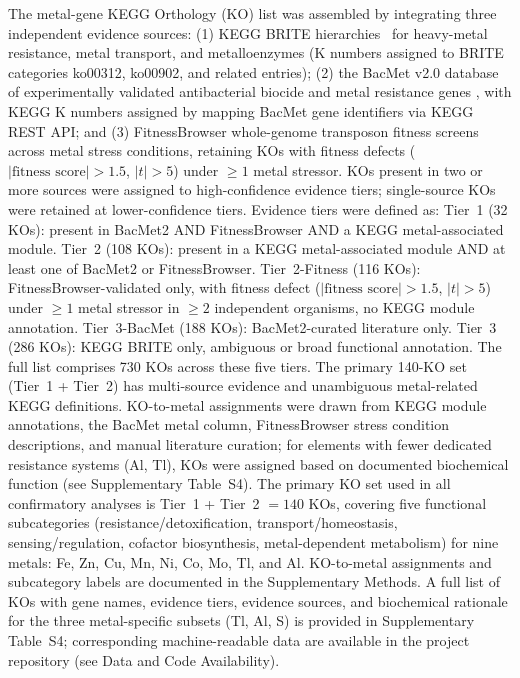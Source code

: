 \documentclass[times]{zHenriquesLab-StyleBioRxiv}
\begin{document}
The metal-gene KEGG Orthology (KO) list was assembled by integrating three
independent evidence sources: (1) KEGG BRITE hierarchies~\cite{kanehisa2023} for heavy-metal
resistance, metal transport, and metalloenzymes (K numbers assigned to BRITE
categories ko00312, ko00902, and related entries); (2) the BacMet v2.0 database
of experimentally validated antibacterial biocide and metal resistance genes
\cite{pal2014}, with KEGG K numbers assigned by mapping BacMet gene identifiers
via KEGG REST API; and (3) FitnessBrowser whole-genome transposon fitness
screens across metal stress conditions, retaining KOs with fitness defects
($|\text{fitness score}| > 1.5$, $|t| > 5$) under $\geq 1$ metal stressor.
KOs present in two or more sources were assigned to high-confidence evidence
tiers; single-source KOs were retained at lower-confidence tiers. Evidence tiers
were defined as: Tier~1 (32 KOs): present in BacMet2 AND FitnessBrowser AND a
KEGG metal-associated module. Tier~2 (108 KOs): present in a KEGG
metal-associated module AND at least one of BacMet2 or FitnessBrowser.
Tier~2-Fitness (116 KOs): FitnessBrowser-validated only, with fitness defect
($|\text{fitness score}| > 1.5$, $|t| > 5$) under $\geq 1$ metal stressor in
$\geq 2$ independent organisms, no KEGG module annotation. Tier~3-BacMet
(188 KOs): BacMet2-curated literature only. Tier~3 (286 KOs): KEGG BRITE only,
ambiguous or broad functional annotation. The full list comprises 730 KOs
across these five tiers. The primary 140-KO set (Tier~1 + Tier~2) has
multi-source evidence and unambiguous metal-related KEGG definitions. KO-to-metal
assignments were drawn from KEGG module annotations, the BacMet metal column,
FitnessBrowser stress condition descriptions, and manual literature curation; for
elements with fewer dedicated resistance systems (Al, Tl), KOs were assigned
based on documented biochemical function (see Supplementary Table~S4). The primary KO set used in all confirmatory analyses
is Tier~1 + Tier~2 $= 140$ KOs, covering five functional subcategories
(resistance/detoxification, transport/homeostasis, sensing/regulation, cofactor
biosynthesis, metal-dependent metabolism) for nine metals: Fe, Zn, Cu, Mn, Ni,
Co, Mo, Tl, and Al. KO-to-metal assignments and subcategory labels are
documented in the Supplementary Methods. A full list of KOs with gene names,
evidence tiers, evidence sources, and biochemical rationale for the three
metal-specific subsets (Tl, Al, S) is provided in Supplementary Table~S4;
corresponding machine-readable data are available in the project repository
(see Data and Code Availability).
\end{document}
